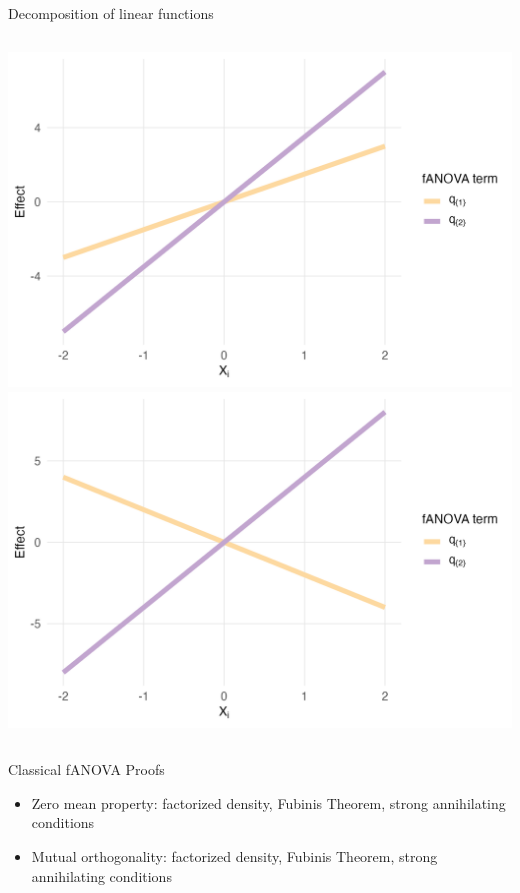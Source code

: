\begin{frame}{Decomposition of linear functions}
  \begin{columns}
      \includegraphics[width=\linewidth]{../images/experiment_section/linear_a1p15_a2p35_a11p00_a22p00_a12p00_rhop00_main.png}
      \includegraphics[width=\linewidth]{../images/experiment_section/linear_a1m20_a2p40_a11p00_a22p00_a12p00_rhop00_main.png}
  \end{columns}
\end{frame}


\begin{frame}{Classical fANOVA Proofs}
    \begin{itemize}
        \item Zero mean property: factorized density, Fubinis Theorem, strong annihilating conditions
        \item Mutual orthogonality: factorized density, Fubinis Theorem, strong annihilating conditions
    \end{itemize}
\end{frame}

